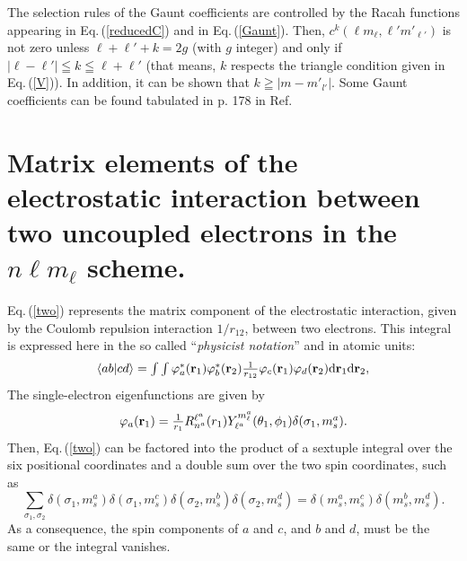 \documentclass[]{interact}
\def\refe#1{{\color{blue}\textsf{Eq.}\,(\ref{#1})}}
\def\r#1{{\bf r}_#1}
\def\d{\mathrm{d}}
\renewcommand{\l}{\ell}
\begin{document}
The selection rules of the Gaunt coefficients are controlled by the Racah functions appearing in \refe{reducedC} and in \refe{Gaunt}. Then, $c^k(\l m_\l,\l'm'_{\l'})$ is not zero unless $\l+\l'+k=2g$ (with $g$ integer) and only if $|\l-\l'|\leqq k\leqq \l+\l'$ (that means, $k$ respects the triangle condition given in \refe{V}). In addition, it can be shown that $k\geqq|m-m'_{l'}|$. Some Gaunt coefficients can be found tabulated in p. 178 in Ref. \cite{Condon} 

\section{Matrix elements of the electrostatic interaction between two uncoupled electrons in the $n\l m_\l$ scheme.}

\refe{two} represents the matrix component of the electrostatic interaction, given by the Coulomb repulsion interaction $1/r_{12}$, between two electrons. This integral is expressed here in the so called ``\emph{physicist notation}'' and in atomic units:
\begin{equation}
\label{two}
\begin{array}{rcl}
\langle ab|cd \rangle = \int\int\varphi_a^*(\r1)\varphi_b^*(\r2)\frac{1}{r_{12}}\varphi_c(\r1)\varphi_d(\r2)\d\r1\d\r2,
\end{array}
\end{equation}
The single-electron eigenfunctions are given by  
\begin{equation}
\label{orbitals}
\begin{array}{rcl}
\varphi_a(\r1) = \frac{1}{r_1}R_{n^a}^{\l^a}(r_1)Y_{\l^a}^{m_\l^a}(\theta_1,\phi_1)\delta(\sigma_1,m_s^a).
\end{array}
\end{equation}
Then, \refe{two} can be factored into the product of a sextuple integral over the six positional coordinates and a double sum over the two spin coordinates, such as
\begin{equation}
 \sum_{\sigma_1,\sigma_2}\delta(\sigma_1,m_s^a)\delta(\sigma_1,m_s^c)\delta(\sigma_2,m_s^b)\delta(\sigma_2,m_s^d)=\delta(m_s^a,m_s^c)\delta(m_s^b,m_s^d).
\end{equation}
As a consequence, the spin components of $a$ and $c$, and $b$ and $d$, must be the same or the integral vanishes.
\end{document}
